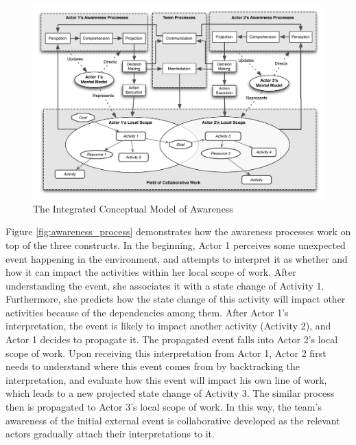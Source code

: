 \begin{figure}[htbp] %
   \centering
   \includegraphics[width=5.5in]{conceptual_framework.pdf} 
   \caption{The Integrated Conceptual Model of Awareness}
   \label{fig:conceptual_framework}
\end{figure}

Figure \ref{fig:awareness_process} demonstrates how the awareness processes work on top of the three constructs. In the beginning, Actor 1 perceives some unexpected event happening in the environment, and attempts to interpret it as whether and how it can impact the activities within her local scope of work. After understanding the event, she associates it with a state change of Activity 1. Furthermore, she predicts how the state change of this activity will impact other activities because of the dependencies among them. After Actor 1’s interpretation, the event is likely to impact another activity (Activity 2), and Actor 1 decides to propagate it. The propagated event falls into Actor 2’s local scope of work. Upon receiving this interpretation from Actor 1, Actor 2 first needs to understand where this event comes from by backtracking the interpretation, and evaluate how this event will impact his own line of work, which leads to a new projected state change of Activity 3. The similar process then is propagated to Actor 3’s local scope of work. In this way, the team’s awareness of the initial external event is collaborative developed as the relevant actors gradually attach their interpretations to it. 

